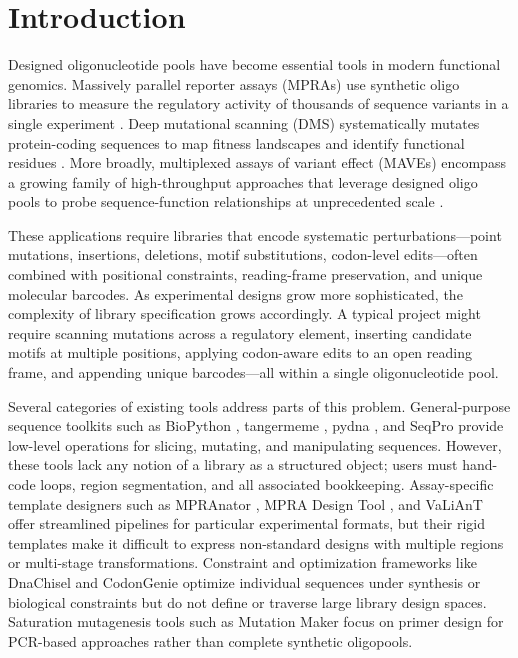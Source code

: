 \documentclass[unnumsec,webpdf,modern,large]{mam-authoring-template}%
\theoremstyle{thmstyleone}%
\theoremstyle{thmstyletwo}%
\theoremstyle{thmstylethree}%
\begin{document}
\maketitle

\section{Introduction}

Designed oligonucleotide pools have become essential tools in modern functional genomics. Massively parallel reporter assays (MPRAs) use synthetic oligo libraries to measure the regulatory activity of thousands of sequence variants in a single experiment \citep{Inoue2015cs}. Deep mutational scanning (DMS) systematically mutates protein-coding sequences to map fitness landscapes and identify functional residues \citep{Fowler2014gq}. More broadly, multiplexed assays of variant effect (MAVEs) encompass a growing family of high-throughput approaches that leverage designed oligo pools to probe sequence-function relationships at unprecedented scale \citep{Kinney2019jc}.

These applications require libraries that encode systematic perturbations---point mutations, insertions, deletions, motif substitutions, codon-level edits---often combined with positional constraints, reading-frame preservation, and unique molecular barcodes. As experimental designs grow more sophisticated, the complexity of library specification grows accordingly. A typical project might require scanning mutations across a regulatory element, inserting candidate motifs at multiple positions, applying codon-aware edits to an open reading frame, and appending unique barcodes---all within a single oligonucleotide pool.

Several categories of existing tools address parts of this problem. General-purpose sequence toolkits such as BioPython \citep{Cock2009df}, tangermeme \citep{Schreiber2025nd}, pydna \citep{Pereira2015wj}, and SeqPro \citep{Klie2023kg} provide low-level operations for slicing, mutating, and manipulating sequences. However, these tools lack any notion of a library as a structured object; users must hand-code loops, region segmentation, and all associated bookkeeping. Assay-specific template designers such as MPRAnator \citep{GeorgakopoulosSoares2017gb}, MPRA Design Tool \citep{Ghazi2018aa}, and VaLiAnT \citep{Barbon2022th} offer streamlined pipelines for particular experimental formats, but their rigid templates make it difficult to express non-standard designs with multiple regions or multi-stage transformations. Constraint and optimization frameworks like DnaChisel \citep{Zulkower2020jk} and CodonGenie \citep{Swainston2017rb} optimize individual sequences under synthesis or biological constraints but do not define or traverse large library design spaces. Saturation mutagenesis tools such as Mutation Maker \citep{Hiraga2021yg} focus on primer design for PCR-based approaches rather than complete synthetic oligopools.
\end{document}
